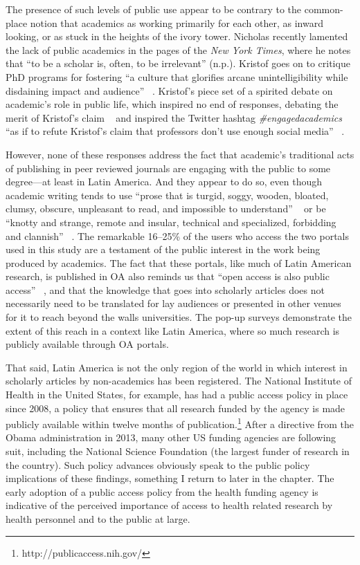 The presence of such levels of public use appear to be contrary to the common-place notion that academics as working primarily for each other, as inward looking, or as stuck in the heights of the ivory tower. Nicholas  \citet{Kristof2014} recently lamented the lack of public academics in the pages of the \emph{New York Times}, where he notes that ``to be a scholar is, often, to be irrelevant'' (n.p.). Kristof goes on to critique PhD programs for fostering ``a culture that glorifies arcane unintelligibility while disdaining impact and audience'' ~\citep[n.p]{Kristof2014}. Kristof's piece set of a spirited debate on academic's role in public life, which inspired no end of responses, debating the merit of Kristof's claim ~\citep{Daniels2014,Rothman2014,Chinn2014,Voeten2014} and inspired the Twitter hashtag \emph{\#engagedacademics} ``as if to refute Kristof's claim that professors don't use enough social media'' ~\citep[n.p.]{Rothman2014}.

However, none of these responses address the fact that academic's traditional acts of publishing in peer reviewed journals are engaging with the public to some degree—at least in Latin America. And they appear to do so, even though academic writing tends to use ``prose that is turgid, soggy, wooden, bloated, clumsy, obscure, unpleasant to read, and impossible to understand'' ~\citep[n.p.]{Pinker2014} or be ``knotty and strange, remote and insular, technical and specialized, forbidding and clannish'' ~\citep[n.p.]{Rothman2014}. The remarkable 16--25\% of the users who access the two portals used in this study are a testament of the public interest in the work being produced by academics. The fact that these portals, like much of Latin American research, is published in OA also reminds us that ``open access is also public access'' ~\citep[p. 111]{Willinsky2006}, and that the knowledge that goes into scholarly articles does not necessarily need to be translated for lay audiences or presented in other venues for it to reach beyond the walls universities. The pop-up surveys demonstrate the extent of this reach in a context like Latin America, where so much research is publicly available through OA portals.

That said, Latin America is not the only region of the world in which interest in scholarly articles by non-academics has been registered. The National Institute of Health in the United States, for example, has had a public access policy in place since 2008, a policy that ensures that all research funded by the agency is made publicly available within twelve months of publication.\footnote{http:\slash \slash publicaccess.nih.gov\slash } After a directive from the Obama administration in 2013, many other US funding agencies are following suit, including the National Science Foundation (the largest funder of research in the country). Such policy advances obviously speak to the public policy implications of these findings, something I return to later in the chapter. The early adoption of a public access policy from the health funding agency is indicative of the perceived importance of access to health related research by health personnel and to the public at large.

